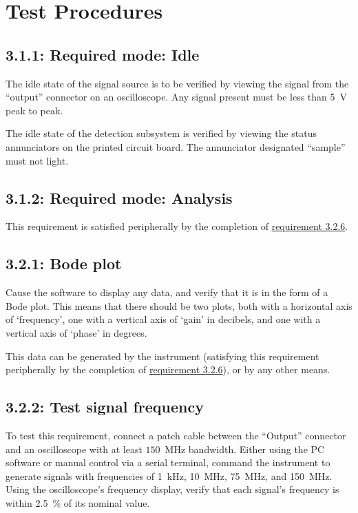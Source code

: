 \chapter{Test Procedures}
\label{chap:test}

\section*{3.1.1: Required mode: Idle}
The idle state of the signal source is to be verified by viewing the signal from the
``output'' connector on an oscilloscope. Any signal present must be less than 5~V peak to peak.

The idle state of the detection subsystem is verified by viewing the status annunciators on
the printed circuit board. The annunciator designated ``sample'' must not light.


\section*{3.1.2: Required mode: Analysis}
This requirement is satisfied peripherally by the completion of \hyperref[tp:3.2.6]{requirement 3.2.6}.

\section*{3.2.1: Bode plot}
\label{tp:3.2.1}
Cause the software to display any data, and verify that it is in the form of a Bode plot.
This means that there should be two plots, both with a horizontal axis of `frequency',
one with a vertical axis of `gain' in decibels, and one with a vertical axis of `phase'
in degrees.

This data can be generated by the instrument (satisfying this requirement peripherally
by the completion of \hyperref[tp:3.2.6]{requirement 3.2.6}), or by any other means.

\section*{3.2.2: Test signal frequency}
\label{tp:3.2.2}
To test this requirement, connect a patch cable between the ``Output'' connector and an oscilloscope
with at least $150$~MHz bandwidth. Either using the PC software or manual control via a serial
terminal, command the instrument to generate signals with frequencies of 1~kHz, 10~MHz, 75~MHz,
and 150~MHz. Using the oscilloscope's frequency display, verify that each signal's frequency is
within 2.5~\% of its nominal value.

